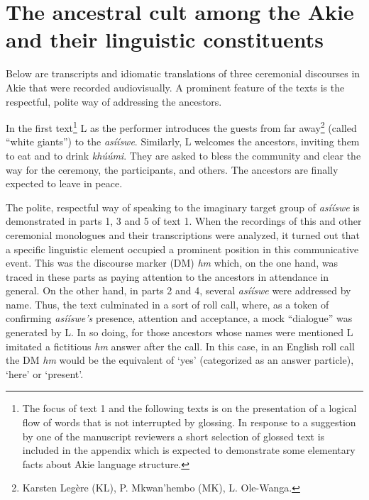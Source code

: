 \documentclass[output=paper,colorlinks,citecolor=brown]{langscibook}
\begin{document}
\section{The  ancestral cult among the Akie and their linguistic constituents}\label{sec:legere:4}

Below are transcripts and idiomatic translations of three ceremonial discourses in Akie that were recorded audiovisually. A prominent feature of the texts is the respectful, polite way of addressing the ancestors. 

In the first text\footnote{The focus of text 1 and the following texts is on the presentation of a logical flow of words that is not interrupted by glossing. In response to a suggestion by one of the manuscript reviewers a short selection of glossed text is included in the appendix which is expected to demonstrate some elementary facts about Akie language structure.}  L as the performer introduces the guests from far away\footnote{Karsten Legère (KL), P. Mkwan’hembo (MK), L. Ole-Wanga.} (called “white giants”) to the \textit{asííswe}. Similarly, L welcomes the ancestors, inviting them to eat and to drink \textit{khúúmi}. They are asked to bless the community and clear the way for the ceremony, the participants, and others. The ancestors are finally expected to leave in peace.

The polite, respectful way of speaking to the imaginary target group of \textit{asííswe} is demonstrated in parts 1, 3 and 5 of text 1. When the recordings of this and other ceremonial monologues and their transcriptions were analyzed, it turned out that a specific linguistic element occupied a prominent position in this communicative event. This was the discourse marker (DM) \textit{hm} which, on the one hand, was traced in these parts as paying attention to the ancestors in attendance in general. On the other hand, in parts 2 and 4, several \textit{asííswe} were addressed by name. Thus, the text culminated in a sort of roll call,  where, as a token of confirming \textit{asííswe’s} presence, attention and acceptance, a mock “dialogue” was generated by L. In so doing, for those ancestors whose names were mentioned L imitated a fictitious \textit{hm} answer after the call. In this case, in an English roll call the DM \textit{hm} would be the equivalent of ‘yes’ (categorized as an answer particle), ‘here’ or ‘present’.
\end{document}
